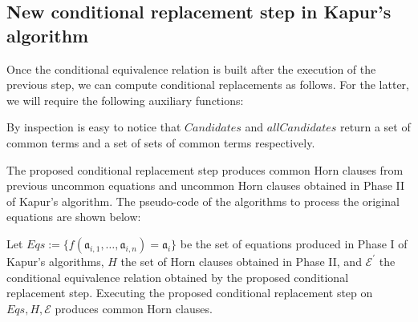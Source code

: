 \subsection{New conditional replacement
step in Kapur's algorithm}

Once the conditional equivalence relation is built after 
the execution of the previous step, we can compute conditional
replacements as follows. For the latter, we will require 
the following auxiliary functions:




By inspection is easy to notice that $Candidates$ 
and $allCandidates$ return a set of common terms and
a set of sets of common terms respectively.

The proposed conditional replacement step produces common Horn 
clauses from previous uncommon equations and uncommon Horn 
clauses obtained in Phase II of Kapur's algorithm.
The pseudo-code of the algorithms to 
process the original equations are shown below:




\begin{lemma} \label{conditional_replacement_lemma}
  Let $Eqs := \{f(\mathfrak{a}_{i, 1}, \dots, \mathfrak{a}_{i, n}) 
  = \mathfrak{a}_i\}$ be the set of equations produced
  in Phase I of Kapur's algorithms, $H$ the set of 
  Horn clauses obtained in Phase II, and $\mathcal{E^{'}}$ the 
  conditional equivalence
  relation obtained by the proposed conditional replacement
  step.
  Executing the proposed conditional replacement step
  on $Eqs, H, \mathcal{E}$ produces common Horn clauses.
\end{lemma}

